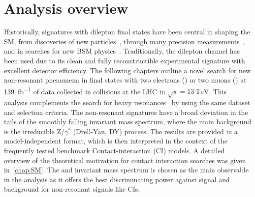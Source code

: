 \chapter*{Analysis overview}\label{chap:analyintro}


Historically, signatures with dilepton final states have been central in shaping the SM, from discoveries of new particles~\cite{PhysRevLett.33.1404, PhysRevLett.33.1406,1977PhRvL..39..252H,1983398,BAGNAIA1983130}, through many precision measurements~\cite{ALEPH:2005ab,Aad:2016zzw,Aad:2016izn,Sirunyan:2018swq}, and in searches for new BSM physics~\cite{Aad:2019fac,Sirunyan:2018exx,Sirunyan:2018ipj,EXOT-2016-05}. Traditionally, the dilepton channel has been used due to its clean and fully reconstructible experimental signature with excellent detector efficiency. The following chapters outline a novel search for new non-resonant phenomena in final states with two electrons (\ee) or two muons (\mumu) at \SI{139}{\femto\barn^{-1}} of data collected in \protonproton collisions at the LHC in $\sqrt{s}=\SI{13}{\tera\electronvolt}$. This analysis complements the search for heavy resonances~\cite{Aad:2019fac} by using the same dataset and selection criteria. The non-resonant signatures have a broad deviation in the tails of the smoothly falling invariant mass spectrum, where the main background is the irreducible Z/$\gamma^*$ (Drell-Yan, DY) process. The results are provided in a model-independent format, which is then interpreted in the context of the frequently tested benchmark Contact-interaction (CI) models. A detailed overview of the theoretical motivation for contact interaction searches was given in~\cref{chap:SM}. The \ee and \mumu invariant mass spectrum is chosen as the main observable in the analysis as it offers the best discriminating power against signal and background for non-resonant signals like CIs. 

